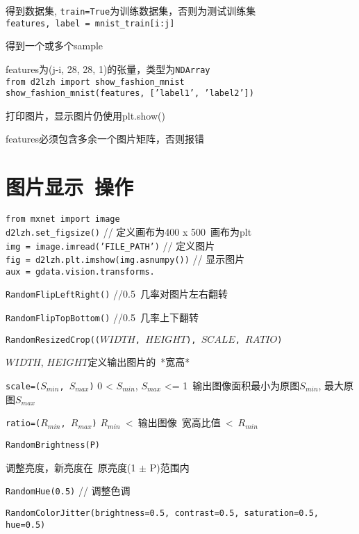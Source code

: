 \documentclass[UTF8]{ctexart}
\begin{document}
  得到数据集, \texttt{train=True}为训练数据集，否则为测试训练集\\
\texttt{features, label = mnist\_train[i:j]}
  
  得到一个或多个sample
  
  features为(j-i, 28, 28, 1)的张量，类型为\texttt{NDArray}\\
\texttt{from d2lzh import show\_fashion\_mnist}\\
\texttt{show\_fashion\_mnist(features, ['label1', 'label2'])}

  打印图片，显示图片仍使用plt.show()

  features必须包含多余一个图片矩阵，否则报错

\section{图片显示\ 操作}
\noindent \texttt{from mxnet import image}\\
\texttt{d2lzh.set\_figsize()} // 定义画布为400 x 500\ 画布为plt\\
\texttt{img = image.imread('FILE\_PATH')} // 定义图片\\
\texttt{fig = d2lzh.plt.imshow(img.asnumpy())} // 显示图片\\
\texttt{aux = gdata.vision.transforms.}

  \texttt{RandomFlipLeftRight()} //0.5\ 几率对图片左右翻转

  \texttt{RandomFlipTopBottom()} //0.5\ 几率上下翻转

  \texttt{RandomResizedCrop(($WIDTH$, $HEIGHT$), $SCALE$, $RATIO$)}

  \quad $WIDTH$, $HEIGHT$定义输出图片的\ *宽高*
    
  \quad \texttt{scale=($S_{min}$, $S_{max}$)} 0 < $S_{min}$, $S_{max}$ <= 1\ 输出图像面积最小为原图$S_{min}$, 最大原图$S_{max}$ 
    
  \quad \texttt{ratio=($R_{min}$, $R_{max}$)} $R_{min}$\ <\ 输出图像\ 宽高比值\ <\ $R_{min}$
  
  \texttt{RandomBrightness(P)} 

  \quad 调整亮度，新亮度在\ 原亮度(1 $\pm$ P)范围内

  \texttt{RandomHue(0.5)} // 调整色调

  \texttt{RandomColorJitter(brightness=0.5, contrast=0.5, saturation=0.5, hue=0.5)}
\end{document}
